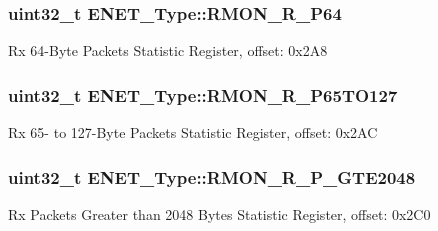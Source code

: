 \subsubsection[{\texorpdfstring{R\+M\+O\+N\+\_\+\+R\+\_\+\+P64}{RMON_R_P64}}]{ uint32\+\_\+t E\+N\+E\+T\+\_\+\+Type\+::\+R\+M\+O\+N\+\_\+\+R\+\_\+\+P64}\hypertarget{structENET__Type_a50ae272f0b3e37bc58b1a121adb7f121}{}\label{structENET__Type_a50ae272f0b3e37bc58b1a121adb7f121}
Rx 64-\/\+Byte Packets Statistic Register, offset\+: 0x2\+A8 
\subsubsection[{\texorpdfstring{R\+M\+O\+N\+\_\+\+R\+\_\+\+P65\+T\+O127}{RMON_R_P65TO127}}]{ uint32\+\_\+t E\+N\+E\+T\+\_\+\+Type\+::\+R\+M\+O\+N\+\_\+\+R\+\_\+\+P65\+T\+O127}\hypertarget{structENET__Type_a1b958e783198e7f0d8583215bdbb623e}{}\label{structENET__Type_a1b958e783198e7f0d8583215bdbb623e}
Rx 65-\/ to 127-\/\+Byte Packets Statistic Register, offset\+: 0x2\+AC 
\subsubsection[{\texorpdfstring{R\+M\+O\+N\+\_\+\+R\+\_\+\+P\+\_\+\+G\+T\+E2048}{RMON_R_P_GTE2048}}]{ uint32\+\_\+t E\+N\+E\+T\+\_\+\+Type\+::\+R\+M\+O\+N\+\_\+\+R\+\_\+\+P\+\_\+\+G\+T\+E2048}\hypertarget{structENET__Type_a8d372b1bd3eae8284c99a6edf897a024}{}\label{structENET__Type_a8d372b1bd3eae8284c99a6edf897a024}
Rx Packets Greater than 2048 Bytes Statistic Register, offset\+: 0x2\+C0 
